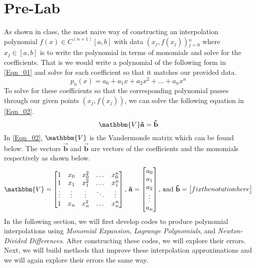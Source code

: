 \documentclass{article}
\begin{document}
\section{Pre-Lab}
As shown in class, the most naive way of constructing an interpolation polynomial \(f(x) \in C^{(n+1)}[a,b]\) with data {\((x_j,f(x_j))\)}\(_{j=0}^n\) where \(x_j \in [a,b]\) is to write the polynomial in terms of monomials and solve for the coefficients. That is we would write a polynomial of the following form in \ref{Eqn_01} and solve for each coefficient so that it matches our provided data.
\begin{equation}
    \label{Eqn_01}
    p_n(x)=a_0+a_1x+a_2x^2+\dots+a_nx^n
\end{equation}
To solve for these coefficients so that the corresponding polynomial passes through our given points \((x_j,f(x_j))\), we can solve the following equation in \ref{Eqn_02}.
\begin{equation}
    \label{Eqn_02}
    \mathbbm{V}\mathbf{\Vec{a}} = \mathbf{\Vec{b}}
\end{equation}
In \ref{Eqn_02}, \(\mathbbm{V}\) is the Vandermonde matrix which can be found below. The vectors \(\mathbf{\Vec{b}}\) and \(\mathbf{\Vec{b}}\) are vectors of the coefficients and the monomials respectively as shown below.
\[
\mathbbm{V} = \begin{bmatrix}
1 & x_0 & x_0^2 & \dots & x_0^n \\
1 & x_1 & x_1^2 & \dots & x_1^n \\
\vdots & \vdots & \vdots & \ddots & \vdots \\
1 & x_n & x_n^2 & \dots & x_n^n
\end{bmatrix} \mbox{, }
\mathbf{\Vec{a}} = \begin{bmatrix}
    a_0 \\
    a_1 \\
    a_2 \\
    \vdots \\
    a_n
\end{bmatrix} \mbox{, and }
\mathbf{\Vec{b}}=\begin{bmatrix}
    fix the notation here
\end{bmatrix}
\]
In the following section, we will first develop codes to produce polynomial interpolations using \textit{Monomial Expansion}, \textit{Lagrange Polynomials}, and \textit{Newton-Divided Differences}. After constructing these codes, we will explore their errors. Next, we will build methods that improve these interpolation approximations and we will again explore their errors the same way.
\end{document}
